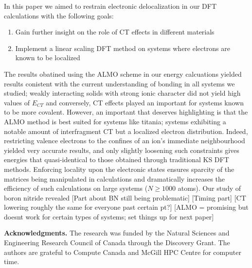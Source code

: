 \documentclass[aps,prb,twocolumn,amsmath,amssymb,superscriptaddress,longbibliography]{revtex4-1}
\begin{document}
In this paper we aimed to restrain electronic delocalization in our DFT calculations with the following goals:
\begin{enumerate}
\item{Gain further insight on the role of CT effects in different materials}
\item{Implement a linear scaling DFT method on systems where electrons are known to be localized}
\end{enumerate}
The results obatined using the ALMO scheme in our energy calcuations yielded results conistent with the current understanding of bonding in all systems we studied; weakly interacting solids with strong ionic character did not yield high values of $E_{CT}$ and conversely, CT effects played an important for systems known to be more covalent.
However, an important that deserves highlighting is that the ALMO method is best suited for systems like titania; systems exhibiting a notable amount of interfragment CT but a localized electron distribution. 
Indeed, restricting valence electrons to the confines of an ion's immediate neighbourhood yielded very accurate results, and only slightly loosening such constraints gives energies that quasi-identical to those obtained through traditional KS DFT methods. 
Enforcing locality upon the electronic states ensures sparcity of the matrices being manipulated in calculations and dramatically increases the efficiency of such calculations on large systems ($N\geq 1000$ atoms).
Our study of boron nitride revealed 
[Part about BN still being problematic]
[Timing part]
[CT lowering roughly the same for everyone past certain pt?]
[ALMO = promising but doesnt work for certain types of systems; set things up for next paper]



\textbf{Acknowledgments.} The research was funded by the Natural Sciences and Engineering Research Council of Canada through the Discovery Grant. The authors are grateful to Compute Canada and McGill HPC Centre for computer time.


%

\end{document}
